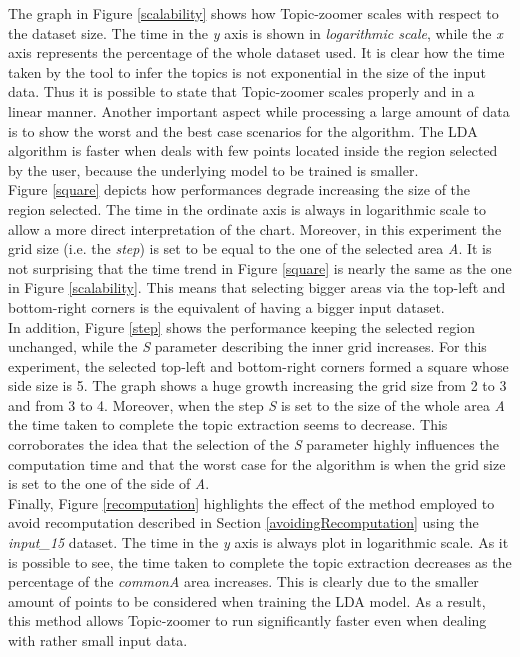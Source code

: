 \documentclass{sig-alternate-05-2015}
\begin{document}
The graph in Figure \ref{scalability} shows how Topic-zoomer scales with respect to the dataset size. The time in the \emph{y} axis is shown in \emph{logarithmic scale}, while the \emph{x} axis represents the percentage of the whole dataset used. It is clear how the time taken by the tool to infer the topics is not exponential in the size of the input data. Thus it is possible to state that Topic-zoomer scales properly and in a linear manner.
Another important aspect while processing a large amount of data is to show the worst and the best case scenarios for the algorithm. The LDA algorithm is faster when deals with few points located inside the region selected by the user, because the underlying model to be trained is smaller.\\
Figure \ref{square} depicts how performances degrade increasing the size of the region selected. The time in the ordinate axis is always in logarithmic scale to allow a more direct interpretation of the chart. Moreover, in this experiment the grid size (i.e. the \emph{step}) is set to be equal to the one of the selected area \emph{A}. It is not surprising that the time trend in Figure \ref{square} is nearly the same as the one in Figure \ref{scalability}. This means that selecting bigger areas via the top-left and bottom-right corners is the equivalent of having a bigger input dataset.\\
In addition, Figure \ref{step} shows the performance keeping the selected region unchanged, while the \emph{S} parameter describing the inner grid increases. For this experiment, the selected top-left and bottom-right corners formed a square whose side size is 5. The graph shows a huge growth increasing the grid size from 2 to 3 and from 3 to 4. Moreover, when the step \emph{S} is set to the size of the whole area \emph{A} the time taken to complete the topic extraction seems to decrease. This corroborates the idea that the selection of the \emph{S} parameter highly influences the computation time and that the worst case for the algorithm is when the grid size is set to the one of the side of \emph{A}.\\
Finally, Figure \ref{recomputation} highlights the effect of the method employed to avoid recomputation described in Section \ref{avoidingRecomputation} using the \emph{input\_15} dataset. The time in the \emph{y} axis is always plot in logarithmic scale. As it is possible to see, the time taken to complete the topic extraction decreases as the percentage of the \emph{commonA} area increases. This is clearly due to the smaller amount of points to be considered when training the LDA model. As a result, this method allows Topic-zoomer to run significantly faster even when dealing with rather small input data.
\end{document}
